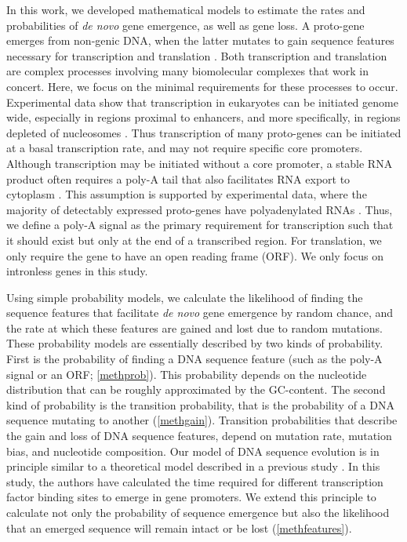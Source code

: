 \documentclass[12pt,a4paper]{article}
\newcommand{\cmnt}[1]{{\color{purple} #1}}
\begin{document}
In this work, we developed mathematical models to estimate the rates and probabilities of \textit{de novo} gene emergence, as well as gene loss. A proto-gene emerges from non-genic DNA, when the latter mutates to gain sequence features necessary for transcription and translation \citep{protogenes,vanOss}. Both transcription and translation are complex processes involving many biomolecular complexes that work in concert. Here, we focus on the minimal requirements for these processes to occur. \cmnt{Experimental data show that transcription in eukaryotes can be initiated genome wide, especially in regions proximal to enhancers, and more specifically, in regions depleted of nucleosomes \citep{enhancers}. Thus transcription of many proto-genes can be initiated at a basal transcription rate, and may not require specific core promoters. Although transcription may be initiated without a core promoter, a stable RNA product often requires a poly-A tail that also facilitates RNA export to cytoplasm \citep{polyAterm,polyAexp}. This assumption is supported by experimental data, where the majority of detectably expressed proto-genes have polyadenylated RNAs \citep{Neme2016,Witt2019,PacoEnhancers,albaYeastdenovo}. Thus, we define a poly-A signal as the primary requirement for transcription such that it should exist but only at the end of a transcribed region.} For translation, we only require the gene to have an open reading frame (ORF). We only focus on intronless genes in this study. 

Using simple probability models, we calculate the likelihood of finding the sequence features that facilitate \textit{de novo} gene emergence by random chance, and the rate at which these features are gained and lost due to random mutations. These probability models are essentially described by two kinds of probability. First is the probability of finding a DNA sequence feature (such as the poly-A signal or an ORF; \autoref{methprob}). This probability depends on the nucleotide distribution \cmnt{that can be roughly approximated by the GC-content}. The second kind of probability is the transition probability, that is the probability of a DNA sequence mutating to another (\autoref{methgain}). Transition probabilities that describe the gain and loss of DNA sequence features, depend on mutation rate, mutation bias, and \cmnt{nucleotide composition}. Our model of DNA sequence evolution is in principle similar to a theoretical model described in a previous study \citep{promoterWaiting}. In this study, the authors have calculated the time required for different transcription factor binding sites to emerge in gene promoters. We extend this principle to calculate not only the probability of sequence emergence but also the likelihood that an emerged sequence will remain intact or be lost (\autoref{methfeatures}).
\end{document}
